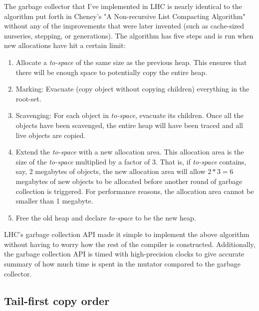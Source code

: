 \documentclass[a4paper,oneside]{memoir}
\begin{document}
The garbage collector that I've implemented in LHC is nearly identical to the
algorithm put forth in Cheney's "A Non-recursive List Compacting Algorithm"
without any of the improvements that were later invented (such as cache-sized
nurseries, stepping, or generations). The algorithm has five steps and is run
when new allocations have hit a certain limit:
\begin{enumerate}
  \item Allocate a \emph{to-space} of the same size as the previous heap. This
  ensures that there will be enough space to potentially copy the entire heap.
  \item Marking: Evacuate (copy object without copying children) everything in the root-set.
  \item Scavenging: For each object in \emph{to-space}, evacuate its children. Once all
  the objects have been scavenged, the entire heap will have been traced and all
  live objects are copied.
  \item Extend the \emph{to-space} with a new allocation area. This allocation
  area is the size of the \emph{to-space} multiplied by a factor of 3. That is,
  if \emph{to-space} contains, say, 2 megabytes of objects, the new allocation
  area will allow $2*3=6$ megabytes of new objects to be allocated before another
  round of garbage collection is triggered. For performance reasons, the allocation
  area cannot be smaller than 1 megabyte.
  \item Free the old heap and declare \emph{to-space} to be the new heap.
\end{enumerate}

LHC's garbage collection API made it simple to implement the above algorithm
without having to worry how the rest of the compiler is constructed.
Additionally, the garbage collection API is timed with high-precision clocks
to give accurate summary of how much time is spent in the mutator compared to
the garbage collector.

\subsection{Tail-first copy order}

\end{document}
